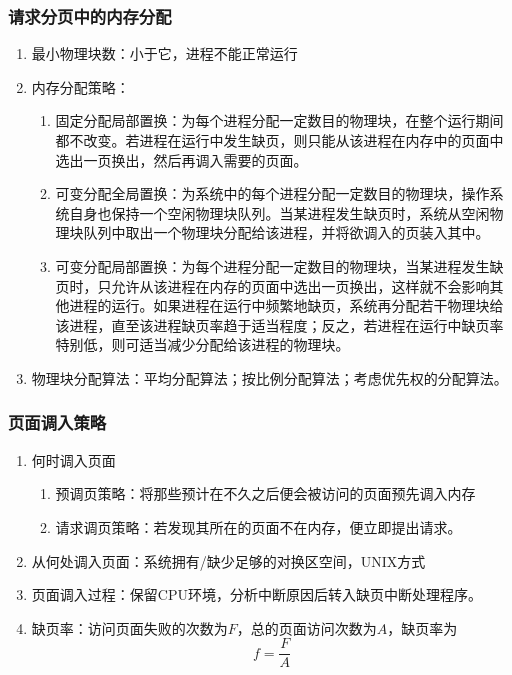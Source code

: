 \documentclass{article}
\begin{document}
\subsubsection{请求分页中的内存分配}
\begin{enumerate}
    \item 最小物理块数：小于它，进程不能正常运行
    \item 内存分配策略：
    \begin{enumerate}
        \item 固定分配局部置换：为每个进程分配一定数目的物理块，在整个运行期间都不改变。若进程在运行中发生缺页，则只能从该进程在内存中的页面中选出一页换出，然后再调入需要的页面。
        \item 可变分配全局置换：为系统中的每个进程分配一定数目的物理块，操作系统自身也保持一个空闲物理块队列。当某进程发生缺页时，系统从空闲物理块队列中取出一个物理块分配给该进程，并将欲调入的页装入其中。
        \item 可变分配局部置换：为每个进程分配一定数目的物理块，当某进程发生缺页时，只允许从该进程在内存的页面中选出一页换出，这样就不会影响其他进程的运行。如果进程在运行中频繁地缺页，系统再分配若干物理块给该进程，直至该进程缺页率趋于适当程度；反之，若进程在运行中缺页率特别低，则可适当减少分配给该进程的物理块。
    \end{enumerate}
    \item 物理块分配算法：平均分配算法；按比例分配算法；考虑优先权的分配算法。
\end{enumerate}

\subsubsection{页面调入策略}
\begin{enumerate}
    \item 何时调入页面
    \begin{enumerate}
        \item 预调页策略：将那些预计在不久之后便会被访问的页面预先调入内存
        \item 请求调页策略：若发现其所在的页面不在内存，便立即提出请求。
    \end{enumerate}
    \item 从何处调入页面：系统拥有/缺少足够的对换区空间，UNIX方式
    \item 页面调入过程：保留CPU环境，分析中断原因后转入缺页中断处理程序。
    \item 缺页率：访问页面失败的次数为$F$，总的页面访问次数为$A$，缺页率为
    \[f=\frac{F}{A}\]
\end{enumerate}
\end{document}
